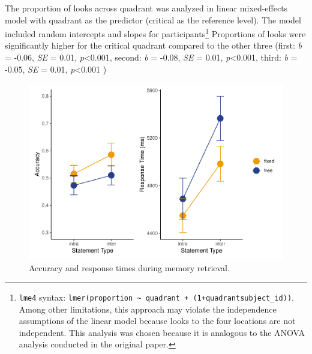 \documentclass[
  english,
  man,floatsintext]{apa6}
\begin{document}
The proportion of looks across quadrant was analyzed in linear mixed-effects model with quadrant as the predictor (critical as the reference level). The model included random intercepts and slopes for participants\footnote{ \texttt{lme4} syntax: \texttt{lmer(proportion\ \textasciitilde{}\ quadrant\ +\ (1+quadrant\textbar{}subject\_id))}. Among other limitations, this approach may violate the independence assumptions of the linear model because looks to the four locations are not independent. This analysis was chosen because it is analogous to the ANOVA analysis conducted in the original paper.} Proportions of looks were significantly higher for the critical quadrant compared to the other three (first: \emph{b} = -0.06, \emph{SE} = 0.01, \emph{p}\textless0.001, second: \emph{b} = -0.08, \emph{SE} = 0.01, \emph{p}\textless0.001, third: \emph{b} = -0.05, \emph{SE} = 0.01, \emph{p}\textless0.001 )

\begin{figure}
\centering
\includegraphics{manuscript_files/figure-latex/E2-rt-acc-fig-1.pdf}
\caption{\label{fig:E2-rt-acc-fig}Accuracy and response times during memory retrieval.}
\end{figure}
\end{document}
